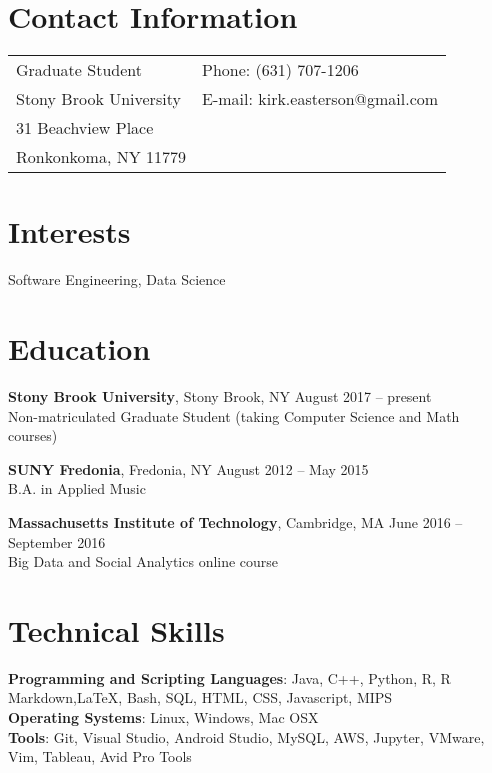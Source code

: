 \documentclass[margin,line]{res}
\begin{document}

\begin{resume}
\section{\sc Contact Information}

\vspace{.05in}
\begin{tabular}{@{}p{3.5in}p{3in}}
Graduate Student      & {Phone:}  (631) 707-1206\\
Stony Brook University
 & {E-mail:}  kirk.easterson@gmail.com\\
31 Beachview Place\\
Ronkonkoma, NY 11779   %
\end{tabular}


\section{\sc Interests}

Software Engineering, Data Science

\section{\sc Education}
{\bf Stony Brook University}, Stony Brook, NY \hfill August 2017 -- present\\
Non-matriculated Graduate Student (taking Computer Science and Math courses)%

{\bf SUNY Fredonia}, Fredonia, NY \hfill August 2012 -- May 2015\\
B.A. in Applied Music %

{\bf Massachusetts Institute of Technology}, Cambridge, MA \hfill June 2016 -- September 2016\\
Big Data and Social Analytics online course

\section{\sc Technical Skills}
{\bf Programming and Scripting Languages}:  Java, C++, Python, R, R Markdown,{\LaTeX}, Bash, SQL, HTML, CSS, Javascript, MIPS\\
{\bf Operating Systems}: Linux, Windows, Mac OSX\\
{\bf Tools}: Git, Visual Studio, Android Studio, MySQL, AWS, Jupyter, VMware, Vim, Tableau, Avid Pro Tools\\



\end{resume}
\end{document}
